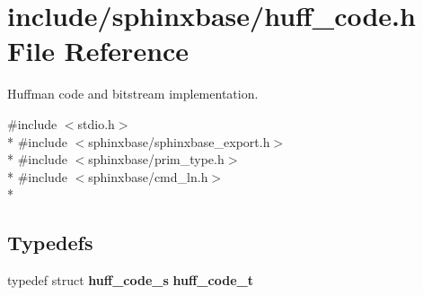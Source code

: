 \section{include/sphinxbase/huff\+\_\+code.h File Reference}
\label{huff__code_8h}


Huffman code and bitstream implementation.  


{\ttfamily \#include $<$stdio.\+h$>$}\\*
{\ttfamily \#include $<$sphinxbase/sphinxbase\+\_\+export.\+h$>$}\\*
{\ttfamily \#include $<$sphinxbase/prim\+\_\+type.\+h$>$}\\*
{\ttfamily \#include $<$sphinxbase/cmd\+\_\+ln.\+h$>$}\\*
\subsection*{Typedefs}
\begin{DoxyCompactItemize}
\item 
typedef struct {\bf huff\+\_\+code\+\_\+s} {\bfseries huff\+\_\+code\+\_\+t}\label{huff__code_8h_a99a5188e6a18682c96100cd5232af0f4}

\end{DoxyCompactItemize}
